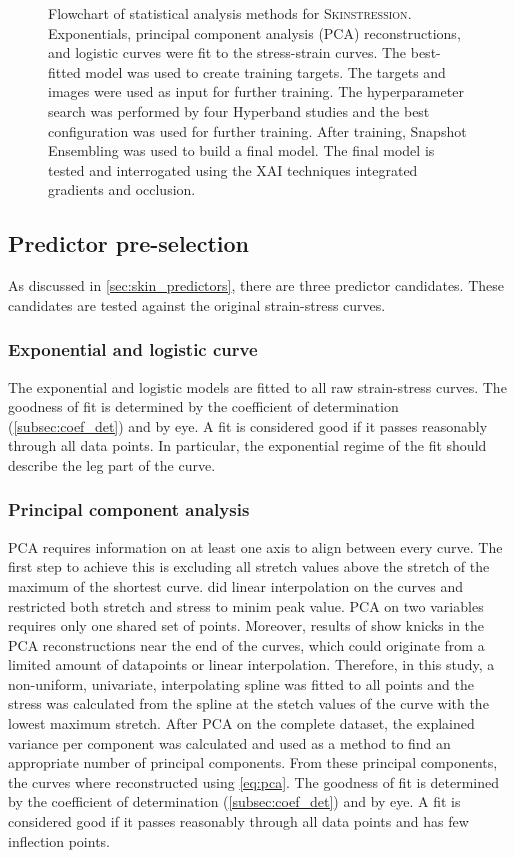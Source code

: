 \begin{figure}[p]
    \caption[Flowchart of statistical analysis methods for \textsc{Skinstression}]{
        Flowchart of statistical analysis methods for \textsc{Skinstression}.
        Exponentials, principal component analysis (PCA) reconstructions, and logistic curves were fit to the stress-strain curves.
        The best-fitted model was used to create training targets.
        The targets and images were used as input for further training.
        The hyperparameter search was performed by four Hyperband studies and the best configuration was used for further training.
        After training, Snapshot Ensembling was used to build a final model.
        The final model is tested and interrogated using the XAI techniques integrated gradients and occlusion.
    }
    \label{fig:skin_stat_methods}
\end{figure}

\subsection{Predictor pre-selection}
As discussed in \cref{sec:skin_predictors}, there are three predictor candidates.
These candidates are tested against the original strain-stress curves.

\subsubsection{Exponential and logistic curve}
The exponential and logistic models are fitted to all raw strain-stress curves.
The goodness of fit is determined by the coefficient of determination (\cref{subsec:coef_det}) and by eye.
A fit is considered good if it passes reasonably through all data points.
In particular, the exponential regime of the fit should describe the leg part of the curve.

\subsubsection{Principal component analysis}
PCA requires information on at least one axis to align between every curve.
The first step to achieve this is excluding all stretch values above the stretch of the maximum of the shortest curve.
\textcite{Soylu2022} did linear interpolation on the curves and restricted both stretch and stress to minim peak value.
PCA on two variables requires only one shared set of points.
Moreover, results of \citeauthor{Soylu2022} show knicks in the PCA reconstructions near the end of the curves, which could originate from a limited amount of datapoints or linear interpolation.
Therefore, in this study, a non-uniform, univariate, interpolating spline was fitted to all points and the stress was calculated from the spline at the stetch values of the curve with the lowest maximum stretch.
After PCA on the complete dataset, the explained variance per component was calculated and used as a method to find an appropriate number of principal components.
From these principal components, the curves where reconstructed using \cref{eq:pca}.
The goodness of fit is determined by the coefficient of determination (\cref{subsec:coef_det}) and by eye.
A fit is considered good if it passes reasonably through all data points and has few inflection points.

